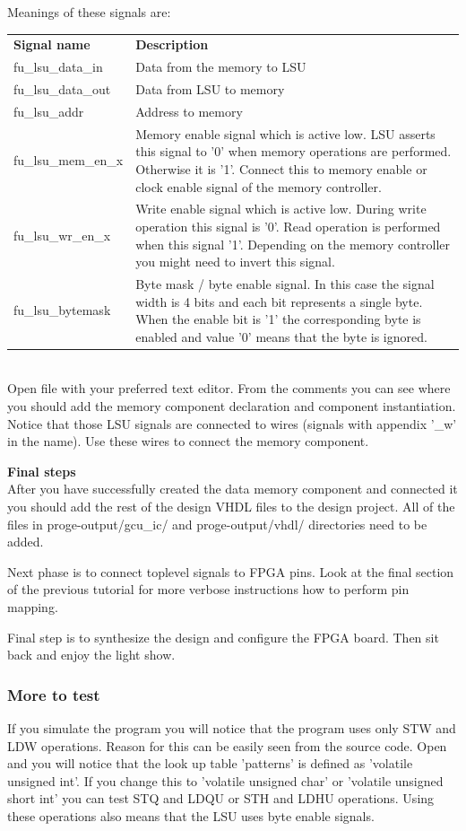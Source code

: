 \documentclass[a4paper,twoside]{tceusermanual}
\begin{document}
Meanings of these signals are:

\begin{tabular}{p{}p{}}
 \textbf{Signal name} & \textbf{Description} \\
 fu\_lsu\_data\_in & Data from the memory to LSU \\
 fu\_lsu\_data\_out & Data from LSU to memory \\
 fu\_lsu\_addr & Address to memory \\
 fu\_lsu\_mem\_en\_x & Memory enable signal which is active low. LSU asserts
 this signal to '0' when memory operations are performed. Otherwise it is '1'.
 Connect this to memory enable or clock enable signal of the memory
 controller. \\
 fu\_lsu\_wr\_en\_x & Write enable signal which is active low. During write
 operation this signal is '0'. Read operation is performed when this signal
 '1'. Depending on the memory controller you might need to invert this
 signal. \\
 fu\_lsu\_bytemask & Byte mask / byte enable signal. In this case the signal
 width is 4 bits and each bit represents a single byte. When the enable bit is
 '1' the corresponding byte is enabled and value '0' means that the byte is
 ignored. \\
\end{tabular} \\

Open file  with your preferred text editor.
From the comments you can see where you should add the memory component
declaration and component instantiation. Notice that those LSU signals are 
connected to wires (signals with appendix '\_w' in the name). Use these wires
to connect the memory component.

\textbf{Final steps} \\
After you have successfully created the data memory component and connected it
you should add the rest of the design VHDL files to the design project. All of
the files in proge-output/gcu\_ic/ and proge-output/vhdl/ directories need to
be added.

Next phase is to connect toplevel signals to FPGA pins. Look at the final
section of the previous tutorial for more verbose instructions how to
perform pin mapping.

Final step is to synthesize the design and configure the FPGA board. Then sit
back and enjoy the light show.

\subsubsection{More to test}
If you simulate the program you will notice that the program uses only STW and
LDW operations. Reason for this can be easily seen from the source code. Open
 and you will notice that the look up table 'patterns' is
defined as 'volatile unsigned int'. If you change this to 'volatile unsigned
char' or 'volatile unsigned short int' you can test STQ and LDQU or STH and
LDHU operations. Using these operations also means that the LSU uses byte
enable signals.
\end{document}
